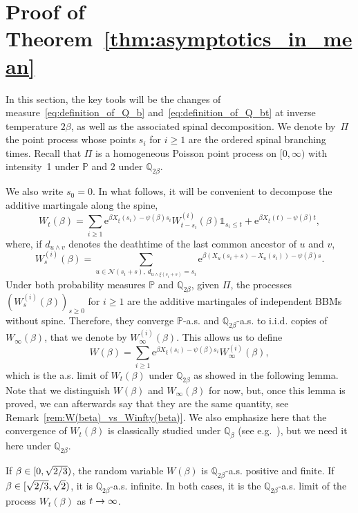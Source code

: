 \documentclass[AHL,Unicode,longabstracts,published]{cedram}
\newcommand{\e}{\mathrm{e}}
\renewcommand{\P}{\mathbb{P}}
\newcommand{\Q}{\mathbb{Q}}
\newcommand\1{\mathds{1}}
\newcommand{\cN}{\mathcal{N}}
\renewcommand*{\to}{\mathchoice{\longrightarrow}{\rightarrow}{\rightarrow}{\rightarrow}}
\begin{document}
\section{Proof of Theorem~\ref{thm:asymptotics_in_mean}}\label{sec:mean}

In this section, the key tools will be the changes of measure~\eqref{eq:definition_of_Q_b} and~\eqref{eq:definition_of_Q_bt} at inverse temperature $2\beta$, as well as the associated spinal decomposition. We denote by~$\Pi$ the point process whose points $s_i$ for $i \geq 1$ are the ordered spinal branching times. Recall that $\Pi$ is a homogeneous Poisson point process on $[0,\infty)$ with intensity~1 under $\P$ and $2$ under $\Q_{2\beta}$.

We also write $s_0 = 0$. In what follows, it will be convenient to decompose the additive martingale along the spine,
\begin{equation}\label{eq:decompo_W_t_spine}
W_t(\beta) = \sum_{i \geq 1} \e^{\beta X_\xi(s_i) - \psi(\beta)s_i} W_{t - s_i}^{(i)}(\beta) \1_{s_i \leq t} + \e^{\beta X_\xi(t) - \psi(\beta)t},
\end{equation}
where, if $d_{u \wedge v}$ denotes the deathtime of the last common ancestor of $u$ and $v$,
\begin{equation*}
W_s^{(i)}(\beta) = \sum_{u \in \cN(s_i + s),\, d_{u \wedge \xi(s_i + s)} = s_i} \e^{\beta (X_u(s_i + s) - X_u(s_i)) - \psi(\beta)s}.
\end{equation*}
Under both probability measures $\P$ and $\Q_{2\beta}$, given $\Pi$, the processes $(W_s^{(i)}(\beta))_{s \geq 0}$ for $i \geq 1$ are the additive martingales of independent BBMs without spine. Therefore, they converge $\P$-a.s. and $\Q_{2\beta}$-a.s. to i.i.d. copies of $W_\infty(\beta)$, that we denote by $W_\infty^{(i)}(\beta)$. This allows us to define
\begin{equation}\label{eq:definition_W}
W(\beta) = \sum_{i \geq 1} \e^{\beta X_\xi(s_i) - \psi(\beta)s_i} W_\infty^{(i)}(\beta),
\end{equation}
which is the a.s. limit of $W_t(\beta)$ under $\Q_{2\beta}$ as showed in the following lemma. Note that we distinguish $W(\beta)$ and $W_\infty(\beta)$ for now, but, once this lemma is proved, we can afterwards say that they are the same quantity, see Remark~\ref{rem:W(beta)_vs_Winfty(beta)}. We also emphasize here that the convergence of $W_t(\beta)$ is classically studied under $\Q_\beta$ (see e.g.~\cite{Kyprianou2004}), but we need it here under $\Q_{2\beta}$.

\begin{lemm}\label{lem:almost_sure_convergence_of_W_t}
If $\beta \in [0, \sqrt{2\smash{/}3})$, the random variable $W(\beta)$ is $\Q_{2\beta}$-a.s. positive and finite. If $\beta \in [\sqrt{2\smash{/}3}, \sqrt{2})$, it is $\Q_{2\beta}$-a.s. infinite. In both cases, it is the $\Q_{2\beta}$-a.s. limit of the process $W_t(\beta)$ as $t \to \infty$.
\end{lemm}
\end{document}
